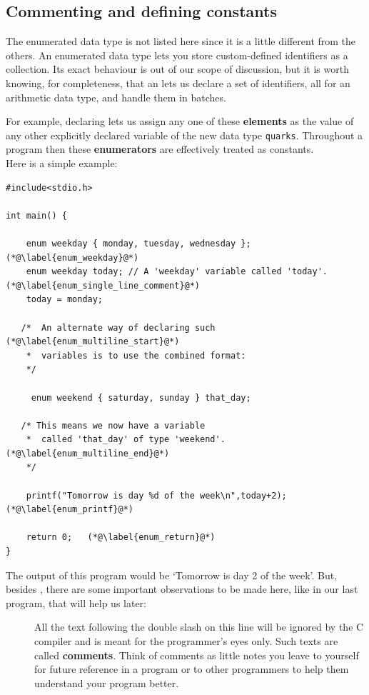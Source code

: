 \documentclass[11pt,oneside]{article}
\begin{document}
{{{{{{{\subsection{Commenting and defining constants}

The enumerated data type  is not listed here since it is a little different from the others. An enumerated data type lets you store custom-defined identifiers as a collection. Its exact behaviour is out of our scope of discussion, but it is worth knowing, for completeness, that an  lets us declare a set of identifiers, all for an arithmetic data type, and handle them in batches.

For example, declaring  lets us assign any one of these \textbf{elements} as the value of any other explicitly declared variable of the new data type \verb+quarks+. Throughout a program then these \textbf{enumerators} are effectively treated as constants.\\

Here is a simple example:

\begin{lstlisting}
#include<stdio.h>

int main() {
    
    enum weekday { monday, tuesday, wednesday };	(*@\label{enum_weekday}@*)
    enum weekday today; // A 'weekday' variable called 'today'. (*@\label{enum_single_line_comment}@*)
    today = monday;
    
   /*  An alternate way of declaring such	(*@\label{enum_multiline_start}@*)
    *  variables is to use the combined format:
    */
    
     enum weekend { saturday, sunday } that_day;
     
   /* This means we now have a variable
    *  called 'that_day' of type 'weekend'.	(*@\label{enum_multiline_end}@*)
    */
    
    printf("Tomorrow is day %d of the week\n",today+2);	(*@\label{enum_printf}@*)
    
    return 0;	(*@\label{enum_return}@*)
}
\end{lstlisting}

The output of this program would be `Tomorrow is day 2 of the week'. But, besides , there are some important observations to be made here, like in our last program, that will help us later:
\begin{description}
\item[] All the text following the double slash \cbox{//} on this line will be ignored by the C compiler and is meant for the programmer's eyes only. Such texts are called \textbf{comments}. Think of comments as little notes you leave to yourself for future reference in a program or to other programmers to help them understand your program better.


\end{description}}}}}}}}
\end{document}
